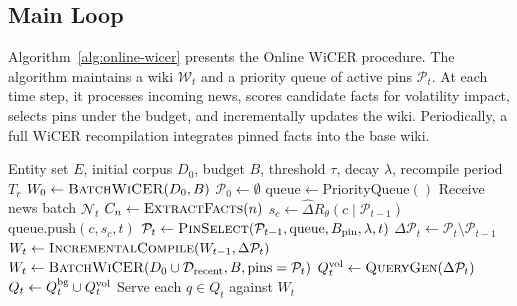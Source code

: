 \documentclass{article}
\newcommand{\wt}{\mathcal{W}_t}
\newcommand{\pt}{\mathcal{P}_t}
\begin{document}
\subsection{Main Loop}

Algorithm~\ref{alg:online-wicer} presents the Online WiCER procedure.
The algorithm maintains a wiki $\wt$ and a priority queue of active pins $\pt$.
At each time step, it processes incoming news, scores candidate facts for volatility impact, selects pins under the budget, and incrementally updates the wiki.
Periodically, a full WiCER recompilation integrates pinned facts into the base wiki.

\begin{algorithm}[t]
\caption{Online WiCER}
\label{alg:online-wicer}
\begin{algorithmic}[1]
\REQUIRE Entity set $E$, initial corpus $D_0$, budget $B$, threshold $\tau$, decay $\lambda$, recompile period $T_r$
\STATE $W_0 \leftarrow \textsc{BatchWiCER}(D_0, B)$
\STATE $\mathcal{P}_0 \leftarrow \emptyset$ 
\STATE $\text{queue} \leftarrow \text{PriorityQueue}()$
  \STATE Receive news batch $\mathcal{N}_t$
    \STATE $C_n \leftarrow \textsc{ExtractFacts}(n)$ 
      \STATE $s_c \leftarrow \hat{\Delta}R_\theta(c \mid \mathcal{P}_{t-1})$ \COMMENT{\S\ref{sec:voltarget},\ref{sec:marginal_scorer}}
        \STATE $\text{queue.push}(c, s_c, t)$
      \ENDIF
    \ENDFOR
  \ENDFOR
  \STATE $\mathcal{P}_t \leftarrow \textsc{PinSelect}(\mathcal{P}_{t-1}, \text{queue}, B_{\text{pin}}, \lambda, t)$ \COMMENT{\S\ref{sec:eviction}}
  \STATE $\Delta\mathcal{P}_t \leftarrow \mathcal{P}_t \setminus \mathcal{P}_{t-1}$ 
  \STATE $W_t \leftarrow \textsc{IncrementalCompile}(W_{t-1}, \Delta\mathcal{P}_t)$
    \STATE $W_t \leftarrow \textsc{BatchWiCER}(D_0 \cup \mathcal{D}_{\text{recent}}, B, \text{pins}=\mathcal{P}_t)$
  \ENDIF
  \STATE $Q_t^{\textup{vol}} \leftarrow \textsc{QueryGen}(\Delta\mathcal{P}_t)$ 
  \STATE $Q_t \leftarrow Q_t^{\textup{bg}} \cup Q_t^{\textup{vol}}$ 
  \STATE Serve each $q \in Q_t$ against $W_t$
\ENDFOR
\end{algorithmic}
\end{algorithm}
\end{document}
